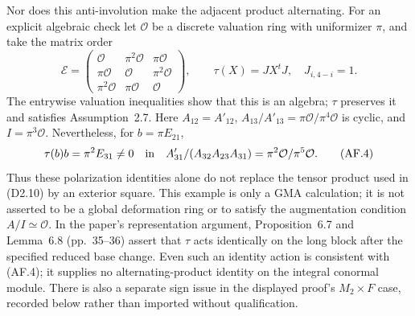 Nor does this anti-involution make the adjacent product alternating.
For an explicit algebraic check let $\mathcal O$ be a discrete valuation
ring with uniformizer $\pi$, and take the matrix order
\[
 \mathcal E=
 \begin{pmatrix}
 \mathcal O&\pi^2\mathcal O&\pi\mathcal O\\
 \pi\mathcal O&\mathcal O&\pi^2\mathcal O\\
 \pi^2\mathcal O&\pi\mathcal O&\mathcal O
 \end{pmatrix},\qquad \tau(X)=JX^tJ,\quad J_{i,4-i}=1.        \tag{AF.3}
\]
The entrywise valuation inequalities show that this is an algebra;
$\tau$ preserves it and satisfies Assumption~2.7.  Here
$A_{12}=A'_{12}$, $A_{13}/A'_{13}=\pi\mathcal O/\pi^4\mathcal O$
is cyclic, and $I=\pi^3\mathcal O$.  Nevertheless, for
$b=\pi E_{21}$,
\[
 \tau(b)b=\pi^2E_{31}\ne0
 \quad\hbox{in}\quad
 A'_{31}/(A_{32}A_{23}A_{31})
       =\pi^2\mathcal O/\pi^5\mathcal O.                    \tag{AF.4}
\]
Thus these polarization identities alone do not replace the tensor
product used in (D2.10) by an exterior square.  This example is only a
GMA calculation; it is not asserted to be a global deformation ring
or to satisfy the augmentation condition $A/I\simeq\mathcal O$.
In the paper's representation argument, Proposition~6.7 and
Lemma~6.8 (pp.~35--36) assert that $\tau$ acts identically on the
long block after the specified reduced base change.  Even such an
identity action is consistent with (AF.4); it supplies no
alternating-product identity on the integral conormal module.
There is also a separate sign issue in the displayed proof's
$M_2\times F$ case, recorded below rather than imported without
qualification.

